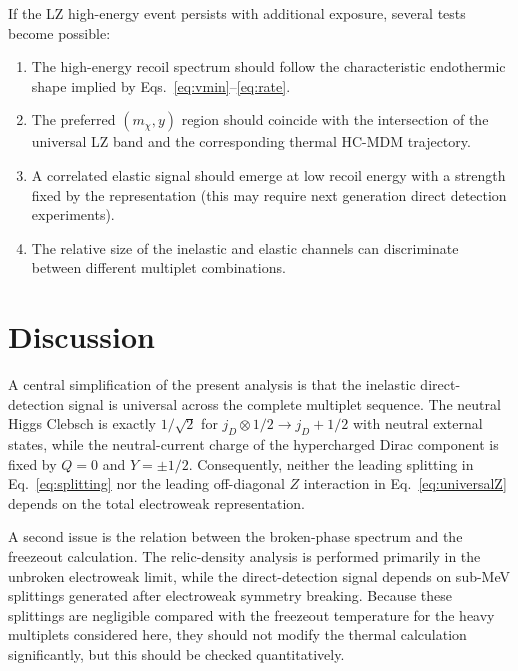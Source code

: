 \documentclass[aps,prd,10pt,twocolumn,amsmath,superscriptaddress,amssymb,showpacs,floatfix,bibnotes,longbibliography]{revtex4-2}
\begin{document}
If the LZ high-energy event persists with additional exposure, several tests become possible:
\begin{enumerate}[leftmargin=1.5em]
\item The high-energy recoil spectrum should follow the characteristic endothermic shape implied by
      Eqs.~\eqref{eq:vmin}--\eqref{eq:rate}.
\item The preferred $(m_\chi,y)$ region should coincide with the intersection of the universal
      LZ band and the corresponding thermal HC-MDM trajectory.
\item A correlated elastic signal should emerge at low recoil energy with a strength fixed by the
      representation (this may require next generation direct detection experiments).
\item The relative size of the inelastic and elastic channels can discriminate between different
      multiplet combinations.
\end{enumerate}



\section{Discussion}

A central simplification of the present analysis is that the inelastic direct-detection signal is
universal across the complete multiplet sequence. The neutral Higgs Clebsch is exactly
$1/\sqrt2$ for $j_D\otimes1/2\rightarrow j_D+1/2$ with neutral external states, while the
neutral-current charge of the hypercharged Dirac component is fixed by $Q=0$ and $Y=\pm1/2$.
Consequently, neither the leading splitting in Eq.~\eqref{eq:splitting} nor the leading
off-diagonal $Z$ interaction in Eq.~\eqref{eq:universalZ} depends on the total electroweak
representation. 

A second issue is the relation between the broken-phase spectrum and the freezeout calculation.
The relic-density analysis is performed primarily in the unbroken electroweak limit, while the
direct-detection signal depends on sub-MeV splittings generated after electroweak symmetry breaking.
Because these splittings are negligible compared with the freezeout temperature for the heavy
multiplets considered here, they should not modify the thermal calculation significantly, but this
should be checked quantitatively.
\end{document}
